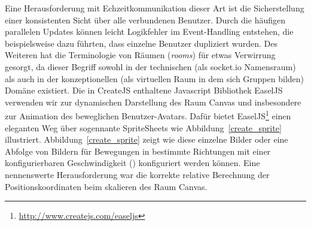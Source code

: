 Eine Herausforderung mit Echzeitkommunikation dieser Art ist die Sicherstellung einer konsistenten Sicht über alle verbundenen Benutzer. Durch die häufigen parallelen Updates können leicht Logikfehler im Event-Handling entstehen, die beispielsweise dazu führten, dass einzelne Benutzer dupliziert wurden. Des Weiteren hat die Terminologie von Räumen (\emph{rooms}) für etwas Verwirrung gesorgt, da dieser Begriff sowohl in der technischen (als socket.io Namensraum) als auch in der konzeptionellen (als virtuellen Raum in dem sich Gruppen bilden) Domäne existiert.
\newline\newline
Die in CreateJS enthaltene Javascript Bibliothek EaselJS verwenden wir zur dynamischen Darstellung des Raum Canvas und insbesondere zur Animation des beweglichen Benutzer-Avatars. Dafür bietet EaselJS\footnote{\url{http://www.createjs.com/easeljs}} einen eleganten Weg über sogennante SpriteSheets wie Abbildung~\ref{create_sprite} illustriert. Abbildung~\ref{create_sprite} zeigt wie diese einzelne Bilder oder eine Abfolge von Bildern für Bewegungen in bestimmte Richtungen mit einer konfigurierbaren Geschwindigkeit () konfiguriert werden können. Eine nennenswerte Herausforderung war die korrekte relative Berechnung der Positionskoordinaten beim skalieren des Raum Canvas.

